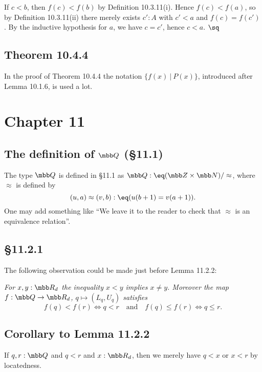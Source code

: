 \documentclass[12pt]{article}
\begin{document}
If $c<b$, then $f(c)<f(b)$ by Definition 10.3.11(i). Hence $f(c)<f(a)$, so by Definition 10.3.11(ii) there merely exists $c':A$ with $c'<a$ and $f(c)=f(c')$. By the inductive hypothesis for $a$, we have $c=c'$, hence $c<a$. $\sq$


\subsection{Theorem 10.4.4}

In the proof of Theorem 10.4.4 the notation $\{f(x)\ \vert\ P(x)\}$, introduced after Lemma 10.1.6, is used a lot.


\section{Chapter 11}

\subsection[The definition of \tb Q (\S11.1)]{The definition of $\mbb Q$ (\S11.1)}

The type $\mbb Q$ is defined in \S11.1 as $\mbb Q:\eq(\mbb Z\times\mbb N)/\approx$, where $\approx$ is defined by 
$$
(u,a)\approx(v,b):\eq(u(b+1)=v(a+1)).
$$ 
One may add something like ``We leave it to the reader to check that $\approx$ is an equivalence relation''.


\subsection{\S11.2.1}

The following observation could be made just before Lemma 11.2.2: 

\nn\emph{For $x,y:\mbb R_d$ the inequality $x<y$ implies $x\neq y$. Moreover the map $f:\mbb Q\to\mbb R_d$, $q\mapsto(L_q,U_q)$ satisfies}
$$
f(q)<f(r)\iff q<r\quad\text{and}\quad f(q)\le f(r)\iff q\le r.
$$ 


\subsection{Corollary to Lemma 11.2.2}\label{1122}

If $q,r:\mbb Q$ and $q<r$ and $x:\mbb R_d$, then we merely have $q<x$ or $x<r$ by locatedness.
\end{document}
